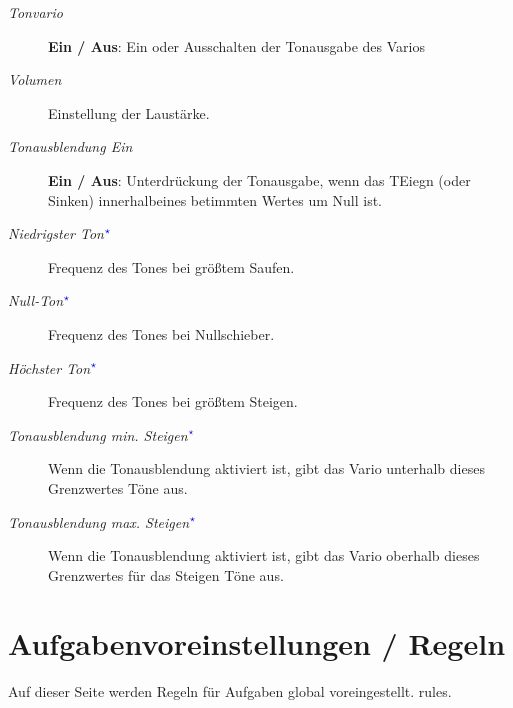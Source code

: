 \begin{description}
\item[\textit{Tonvario}]  {\bf Ein / Aus}:  Ein oder Ausschalten der Tonausgabe des Varios
\item[\textit{Volumen}]  Einstellung der Laustärke.
\item[\textit{Tonausblendung Ein}]  {\bf Ein / Aus}: Unterdrückung der Tonausgabe, wenn das TEiegn (oder Sinken) innerhalbeines betimmten Wertes um Null ist.
\item[\textit{Niedrigster Ton$^{\textcolor{blue}{\star}}$}]  Frequenz des Tones bei größtem Saufen.
\item[\textit{Null-Ton$^{\textcolor{blue}{\star}}$}]  Frequenz des Tones bei Nullschieber.
\item[\textit{Höchster Ton$^{\textcolor{blue}{\star}}$}]  Frequenz des Tones bei größtem Steigen.
\item[\textit{Tonausblendung min. Steigen$^{\textcolor{blue}{\star}}$}]  Wenn die Tonausblendung aktiviert ist, gibt das Vario unterhalb dieses Grenzwertes Töne aus.
\item[\textit{Tonausblendung max. Steigen$^{\textcolor{blue}{\star}}$}]  Wenn die Tonausblendung aktiviert ist, gibt das Vario oberhalb dieses Grenzwertes für das Steigen Töne aus.
\end{description}


\section{Aufgabenvoreinstellungen / Regeln}

Auf dieser Seite werden Regeln für Aufgaben global voreingestellt.
rules. \label{conf:taskrules}

